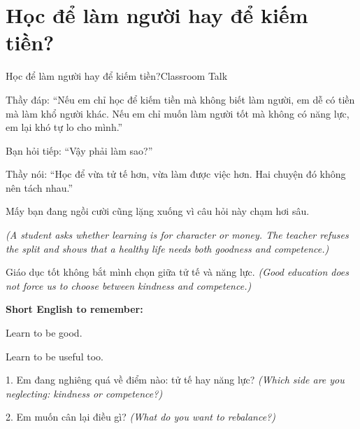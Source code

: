 \section{Học để làm người hay để kiếm tiền?}
\begin{truyen}{Học để làm người hay để kiếm tiền?}{Classroom Talk}

Thầy đáp: ``Nếu em chỉ học để kiếm tiền mà không biết làm người, em dễ có tiền mà làm khổ người khác. Nếu em chỉ muốn làm người tốt mà không có năng lực, em lại khó tự lo cho mình.''

Bạn hỏi tiếp: ``Vậy phải làm sao?''

Thầy nói: ``Học để vừa tử tế hơn, vừa làm được việc hơn. Hai chuyện đó không nên tách nhau.''

Mấy bạn đang ngồi cười cũng lặng xuống vì câu hỏi này chạm hơi sâu.

\textit{(A student asks whether learning is for character or money. The teacher refuses the split and shows that a healthy life needs both goodness and competence.)}
\end{truyen}

\begin{baihoc}
Giáo dục tốt không bắt mình chọn giữa tử tế và năng lực.
\textit{(Good education does not force us to choose between kindness and competence.)}
\end{baihoc}

\begin{ghinhoanh}
\textbf{Short English to remember:}

Learn to be good.

Learn to be useful too.
\end{ghinhoanh}

\begin{tuhocnhanh}
1. Em đang nghiêng quá về điểm nào: tử tế hay năng lực? \textit{(Which side are you neglecting: kindness or competence?)}

2. Em muốn cân lại điều gì? \textit{(What do you want to rebalance?)}
\end{tuhocnhanh}
\ngancach

